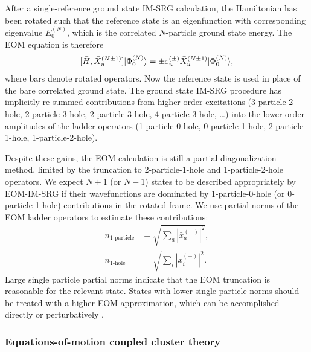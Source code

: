 After a single-reference ground state IM-SRG calculation, the Hamiltonian has been rotated such that the reference state is an eigenfunction with corresponding eigenvalue $E^{(N)}_0$, which is the correlated $N$-particle ground state energy. The EOM equation is therefore
\begin{align} \label{eq:EOMIMSRG}
  [\bar{H},\bar{X}^{(N \pm 1)}_u] | \Phi^{(N)}_0 \rangle = \pm \varepsilon^{(\pm)}_u \bar{X}^{(N \pm 1)}_u | \Phi^{(N)}_0 \rangle,
\end{align}
where bars denote rotated operators. Now the reference state is used in place of the bare correlated ground state. The ground state IM-SRG procedure has implicitly re-summed contributions from higher order excitations (3-particle-2-hole, 2-particle-3-hole, 2-particle-3-hole, 4-particle-3-hole, \ldots) into the lower order amplitudes of the ladder operators (1-particle-0-hole, 0-particle-1-hole, 2-particle-1-hole, 1-particle-2-hole).

Despite these gains, the EOM calculation is still a partial diagonalization method, limited by the truncation to 2-particle-1-hole and 1-particle-2-hole operators. We expect $N + 1$ (or $N - 1$) states to be described appropriately by EOM-IM-SRG if their wavefunctions are dominated by 1-particle-0-hole (or 0-particle-1-hole) contributions in the rotated frame. We use partial norms of the EOM ladder operators to estimate these contributions:
\begin{align}
  \label{eq:partial_norms_p}
  n_{\text{1-particle}} &= \sqrt{\sum_a | \bar{x}^{(+)}_a |^2},\\
  \label{eq:partial_norms_h}
  n_{\text{1-hole}} &= \sqrt{\sum_i | \bar{x}^{(-)}_i |^2}.
\end{align}
Large single particle partial norms indicate that the EOM truncation is reasonable for the relevant state. States with lower single particle norms should be treated with a higher EOM approximation, which can be accomplished directly or perturbatively \cite{PhysRevC.95.044304}.

\subsubsection*{Equations-of-motion coupled cluster theory}

